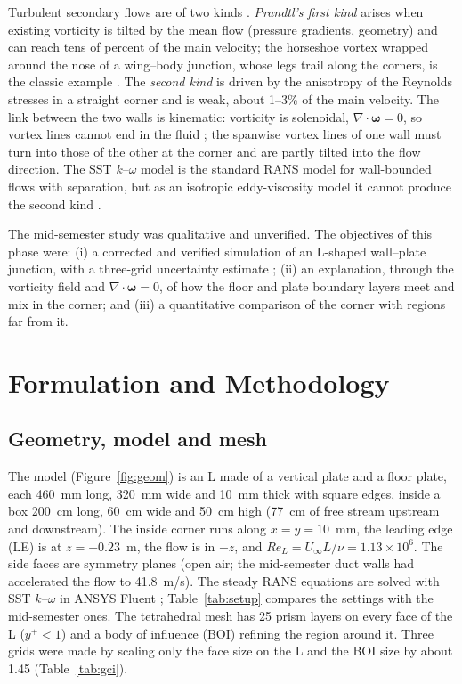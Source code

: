 \documentclass[12pt]{iitdamthes}
\begin{document}
Turbulent secondary flows are of two kinds \citep{bradshaw1987}. \emph{Prandtl's first kind} arises
when existing vorticity is tilted by the mean flow (pressure gradients, geometry) and can reach tens
of percent of the main velocity; the horseshoe vortex wrapped around the nose of a wing--body junction,
whose legs trail along the corners, is the classic example \citep{simpson2001}. The \emph{second kind}
is driven by the anisotropy of the Reynolds stresses in a straight corner \citep{gessner1973} and is
weak, about 1--3\% of the main velocity. The link between the two walls is kinematic: vorticity is
solenoidal, $\nabla\cdot\boldsymbol{\omega}=0$, so vortex lines cannot end in the fluid
\citep{saffman1992}; the spanwise vortex lines of one wall must turn into those of the other at the
corner and are partly tilted into the flow direction. The SST $k$--$\omega$ model \citep{menter1994}
is the standard RANS model for wall-bounded flows with separation, but as an isotropic eddy-viscosity
model it cannot produce the second kind \citep{pope2000}.

The mid-semester study was qualitative and unverified. The objectives of this phase were: (i) a
corrected and verified simulation of an L-shaped wall--plate junction, with a three-grid uncertainty
estimate \citep{celik2008}; (ii) an explanation, through the vorticity field and
$\nabla\cdot\boldsymbol{\omega}=0$, of how the floor and plate boundary layers meet and mix in the
corner; and (iii) a quantitative comparison of the corner with regions far from it.

\chapter{Formulation and Methodology}

\section{Geometry, model and mesh}
The model (Figure~\ref{fig:geom}) is an L made of a vertical plate and a floor plate, each 460~mm
long, 320~mm wide and 10~mm thick with square edges, inside a box 200~cm long, 60~cm wide and
50~cm high (77~cm of free stream upstream and downstream). The inside corner runs along
$x=y=10$~mm, the leading edge (LE) is at $z=+0.23$~m, the flow is in $-z$, and
$Re_L=U_\infty L/\nu=1.13\times10^6$. The side faces are symmetry planes (open air; the mid-semester
duct walls had accelerated the flow to 41.8~m/s). The steady RANS equations are solved with SST $k$--$\omega$ in ANSYS Fluent
\citep{fluent2024}; Table~\ref{tab:setup} compares the settings with the mid-semester ones. The
tetrahedral mesh has 25 prism layers on every face of the L ($y^+<1$) and a body of influence (BOI)
refining the region around it. Three grids were made by scaling only the face size on the L and the
BOI size by about 1.45 (Table~\ref{tab:gci}).
\end{document}
